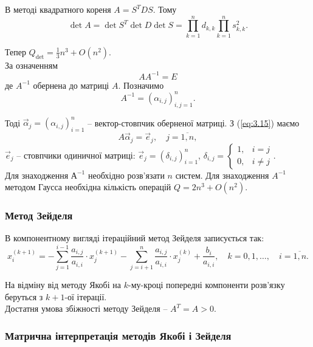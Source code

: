 \documentclass[12pt, a4paper]{article}
\theoremstyle{definition}
\newcommand{\Sum}{\displaystyle\sum\limits}
\newcommand{\Prod}{\displaystyle\prod\limits}
\numberwithin{equation}{section}
\begin{document}
В методі квадратного кореня $A = S^T D S$. Тому 
\begin{equation}
	\label{eq:3.14}
	\det A = \det S^T \det D \det S = \Prod_{k=1}^n d_{k,k} \Prod_{k=1}^n s_{k,k}^2.
\end{equation}

Тепер $Q_{\det} = \frac 13 n^3 + O(n^2)$. \\

За означенням 
\begin{equation}
	\label{eq:3.15}
	AA^{-1} = E
\end{equation}
де $A^{-1}$ обернена до матриці $A$. Позначимо
\[ A^{-1} = (\alpha_{i,j})_{i,j=1}^n.\] 

Тоді $\vec \alpha_j = (\alpha_{i,j})_{i=1}^n$ -- вектор-стовпчик оберненої матриці. З (\ref{eq:3.15}) маємо
\begin{equation}
	\label{eq:3.16}
	A \vec \alpha_j = \vec e_j, \quad j = \overline{1, n},
\end{equation}
$\vec e_j$ -- стовпчики одиничної матриці: $\vec e_j = (\delta_{i,j})_{i=1}^n$, $\delta_{i,j} = \begin{cases} 1, & i = j \\ 0, & i \ne j \end{cases}$. \\

Для знаходження $А^{-1}$ необхідно розв'язати $n$ систем. Для знаходження $A^{-1}$ методом Гаусса необхідна кількість операцій $Q = 2n^3 + O(n^2)$.

\subsubsection{Метод Зейделя}
В компонентному вигляді ітераційний метод Зейделя записується так:
\begin{equation}
	\label{eq:4.10}
	x_i^{(k+1)} = -\Sum_{j=1}^{i-1} \dfrac{a_{i,j}}{a_{i,i}} \cdot x_j^{(k+1)} - \Sum_{j=i+1}^n \dfrac{a_{i,j}}{a_{i,i}} \cdot x_j^{(k)} + \dfrac{b_i}{a_{i,i}}, \quad k = 0,1,\ldots, \quad i=\overline{1,n}.
\end{equation}

На відміну від методу Якобі на $k$-му-кроці попередні компоненти розв'язку беруться з $k+1$-ої ітерації. \\

Достатня умова збіжності методу Зейделя -- $A^T = A > 0$.

\subsubsection{Матрична інтерпретація методів Якобі і Зейделя}
\end{document}
